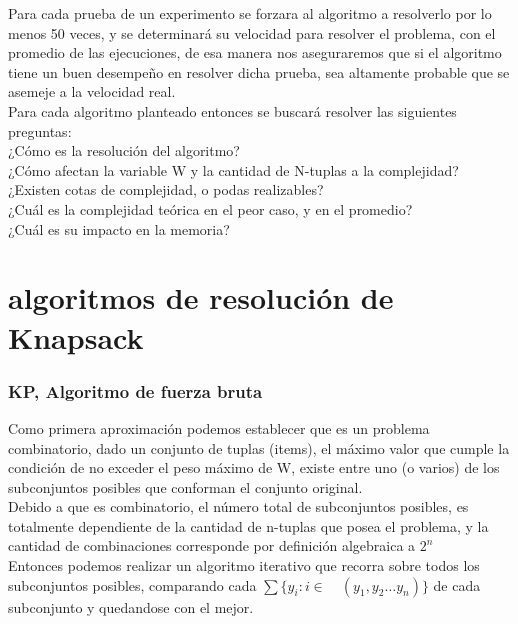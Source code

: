 \documentclass[fleqn, 11pt]{article}
\begin{document}
Para cada prueba de un experimento se forzara al algoritmo a resolverlo por lo menos 50 veces, y se determinará su velocidad para resolver el problema, con el promedio de las ejecuciones, de esa manera nos aseguraremos que si el algoritmo tiene un buen desempeño en resolver dicha prueba, sea altamente probable que se asemeje a la velocidad real.  \\

Para cada algoritmo planteado entonces se buscará resolver las siguientes preguntas:\\

¿Cómo es la resolución del algoritmo?  \\
¿Cómo afectan la variable W y la cantidad de N-tuplas a la complejidad? \\
¿Existen cotas de complejidad, o podas realizables?  \\
¿Cuál es la complejidad teórica en el peor caso, y en el promedio?  \\
¿Cuál es su impacto en la memoria?  \\

\clearpage

\maketitle
\section{algoritmos de resolución de Knapsack}

\subsubsection{\textbf{KP, Algoritmo de fuerza bruta}}

Como primera aproximación podemos establecer que es un problema combinatorio, dado un conjunto de tuplas (items),
el máximo valor que cumple la condición de no exceder el peso máximo de W, existe entre uno (o varios) de los
subconjuntos posibles que conforman el conjunto original. \\

Debido a que es combinatorio, el número total de subconjuntos posibles, es totalmente dependiente de la
cantidad de n-tuplas que posea el problema, y la cantidad de combinaciones corresponde por definición algebraica a $2^n$  \\

Entonces podemos realizar un algoritmo iterativo que recorra sobre todos los subconjuntos posibles, comparando cada $\sum \{ y_i : i \in  \quad (y_1, y_2 \dots y_n)\}$ de cada subconjunto y quedandose con el mejor.
\end{document}
